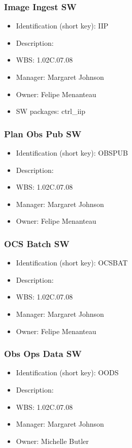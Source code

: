 \subsubsection{Image Ingest SW}\label{sect:IIP}
\begin{itemize}
\item Identification (short key): IIP
\item Description: 
\item WBS: 1.02C.07.08
\item Manager: Margaret Johnson
\item Owner: Felipe Menanteau
\item SW packages: ctrl\_iip
\end{itemize}

\subsubsection{Plan Obs Pub SW}\label{sect:OBSPUB}
\begin{itemize}
\item Identification (short key): OBSPUB
\item Description: 
\item WBS: 1.02C.07.08
\item Manager: Margaret Johnson
\item Owner: Felipe Menanteau
\end{itemize}

\subsubsection{OCS Batch SW}\label{sect:OCSBAT}
\begin{itemize}
\item Identification (short key): OCSBAT
\item Description: 
\item WBS: 1.02C.07.08
\item Manager: Margaret Johnson
\item Owner: Felipe Menanteau
\end{itemize}

\subsubsection{Obs Ops Data SW}\label{sect:OODS}
\begin{itemize}
\item Identification (short key): OODS
\item Description: 
\item WBS: 1.02C.07.08
\item Manager: Margaret Johnson
\item Owner: Michelle Butler
\end{itemize}

